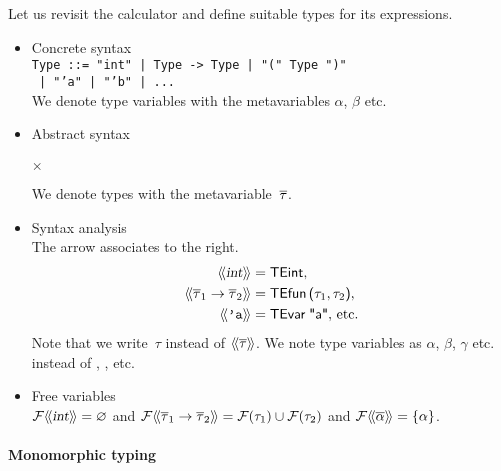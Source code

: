 Let us revisit the calculator and define suitable types for its
expressions.
\begin{itemize}

  \item Concrete syntax\\
    \texttt{Type ::= "int" | Type -> Type | "(" Type ")"}\\
    \texttt{\hphantom{Type ::=} | "'a" | "'b" | ...}\\
    We denote type variables with the metavariables $\alpha$, $\beta$
    etc.

  \item Abstract syntax\\
     \Xtype {} \equal {} \vbar{}
      \Xof {}\\
      \vbar{}  \Xof    
      \(\times\) 

    We denote types with the metavariable~$\overline{\tau}$.

  \item Syntax analysis\\
    The arrow associates to the right.
    \begin{align*}
     \langle\!\langle{\textsl{int}}\rangle\!\rangle &= \textsf{TEint},\\
     \langle\!\langle{\overline{\tau}_1 \rightarrow \overline{\tau}_2}\rangle\!\rangle &= \textsf{TEfun} \,
    \textsf{(} \tau_1, \tau_2\textsf{)},\\
    \langle\!\langle{\texttt{'a}}\rangle\!\rangle &= \textsf{TEvar} \; \textsf{"a"},\,\text{etc.}
    \end{align*}
    Note that we write~$\tau$ instead of $\langle\!\langle{\overline{\tau}}\rangle\!\rangle$. We note
    type variables as $\alpha$, $\beta$, $\gamma$ etc. instead of
     ,  ,   etc.

  \item Free variables\\ $\mathcal{F} \langle\!\langle{\textsl{int}}\rangle\!\rangle = \varnothing$
    and $\mathcal{F} \langle\!\langle{\overline{\tau}_1 \rightarrow \overline{\tau}_2}\rangle\!\rangle =
    \mathcal{F}(\tau_1) \cup \mathcal{F} (\tau_2)$ and $\mathcal{F}
    \langle\!\langle{\overline{\alpha}}\rangle\!\rangle = \{\alpha\}$.

\end{itemize}

\paragraph{Monomorphic typing}

